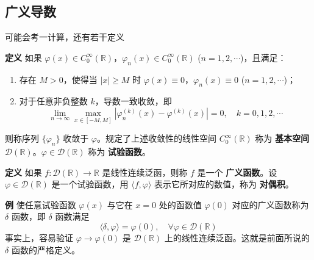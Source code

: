 \documentclass[12pt,a4paper]{ctexart}
\begin{document}
	\subsection{广义导数}
	
	可能会考一计算，还有若干定义
	\vspace{1cm}
	
	\noindent\textbf{定义 } \quad 如果 $\varphi(x) \in C_0^\infty(\mathbb{R})$，$\varphi_n(x) \in C_0^\infty(\mathbb{R})$ ($n=1,2,\cdots$)，且满足：
	\begin{enumerate}
		\item 存在 $M>0$，使得当 $|x| \geqslant M$ 时 $\varphi(x) \equiv 0$，$\varphi_n(x) \equiv 0$ ($n=1,2,\cdots$)；
		\item 对于任意非负整数 $k$，导数一致收敛，即
		\[
		\lim_{n \to \infty} \max_{x \in [-M, M]} \left| \varphi_n^{(k)}(x) - \varphi^{(k)}(x) \right| = 0, \quad k=0,1,2,\cdots
		\]
	\end{enumerate}
	则称序列 $\{\varphi_n\}$ 收敛于 $\varphi$。规定了上述收敛性的线性空间 $C_0^\infty(\mathbb{R})$ 称为 \textbf{基本空间} $\mathscr{D}(\mathbb{R})$。$\varphi \in \mathscr{D}(\mathbb{R})$ 称为 \textbf{试验函数}。
	
	\vspace{1em}
	
	\noindent\textbf{定义 } \quad 如果 $f: \mathscr{D}(\mathbb{R}) \to \mathbb{R}$ 是线性连续泛函，则称 $f$ 是一个 \textbf{广义函数}。设 $\varphi \in \mathscr{D}(\mathbb{R})$ 是一个试验函数，用 $\langle f, \varphi \rangle$ 表示它所对应的数值，称为 \textbf{对偶积}。
	
	\vspace{1em}
	
	\noindent\textbf{例} \quad 使任意试验函数 $\varphi(x)$ 与它在 $x=0$ 处的函数值 $\varphi(0)$ 对应的广义函数称为 $\delta$ 函数，即 $\delta$ 函数满足
	\begin{equation}
		\langle \delta, \varphi \rangle = \varphi(0), \quad \forall \varphi \in \mathscr{D}(\mathbb{R})
	\end{equation}
	事实上，容易验证 $\varphi \to \varphi(0)$ 是 $\mathscr{D}(\mathbb{R})$ 上的线性连续泛函。这就是前面所说的 $\delta$ 函数的严格定义。
	
	\vspace{1em}
	
\end{document}
